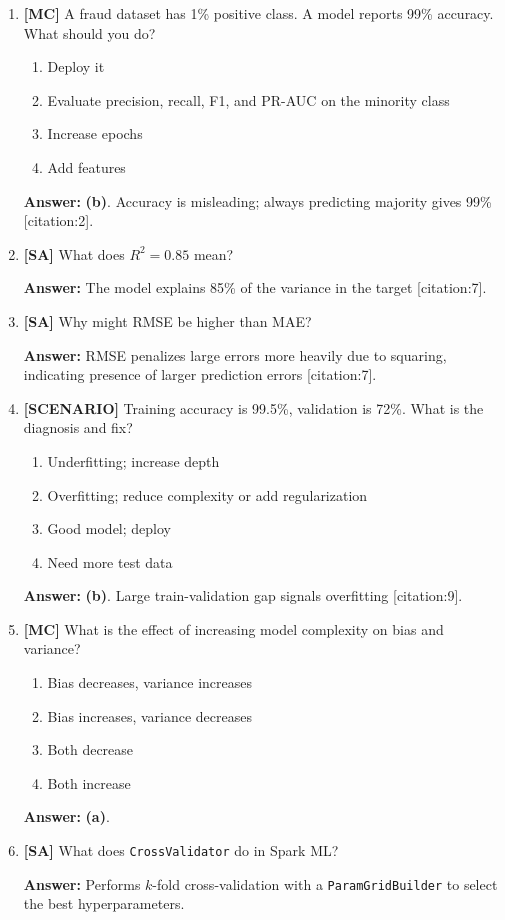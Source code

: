 \documentclass[11pt]{article}
\begin{document}
	\begin{enumerate}[leftmargin=*, label=\textbf{Q\arabic*.}, start=27]
		
		\item \textbf{[MC]} A fraud dataset has 1\% positive class. A model reports 99\% accuracy. What should you do?
		\begin{enumerate}[label=(\alph*)]
			\item Deploy it
			\item Evaluate precision, recall, F1, and PR-AUC on the minority class
			\item Increase epochs
			\item Add features
		\end{enumerate}
		
		\textbf{Answer:} \textbf{(b)}. Accuracy is misleading; always predicting majority gives 99\% [citation:2].
		
		\item \textbf{[SA]} What does $R^2 = 0.85$ mean?
		
		\textbf{Answer:} The model explains 85\% of the variance in the target [citation:7].
		
		\item \textbf{[SA]} Why might RMSE be higher than MAE?
		
		\textbf{Answer:} RMSE penalizes large errors more heavily due to squaring, indicating presence of larger prediction errors [citation:7].
		
		\item \textbf{[SCENARIO]} Training accuracy is 99.5\%, validation is 72\%. What is the diagnosis and fix?
		\begin{enumerate}[label=(\alph*)]
			\item Underfitting; increase depth
			\item Overfitting; reduce complexity or add regularization
			\item Good model; deploy
			\item Need more test data
		\end{enumerate}
		
		\textbf{Answer:} \textbf{(b)}. Large train-validation gap signals overfitting [citation:9].
		
		\item \textbf{[MC]} What is the effect of increasing model complexity on bias and variance?
		\begin{enumerate}[label=(\alph*)]
			\item Bias decreases, variance increases
			\item Bias increases, variance decreases
			\item Both decrease
			\item Both increase
		\end{enumerate}
		
		\textbf{Answer:} \textbf{(a)}.
		
		\item \textbf{[SA]} What does \texttt{CrossValidator} do in Spark ML?
		
		\textbf{Answer:} Performs $k$-fold cross-validation with a \texttt{ParamGridBuilder} to select the best hyperparameters.
		
	\end{enumerate}
\end{document}
